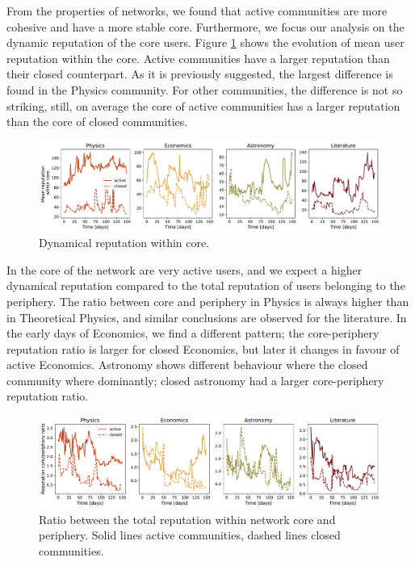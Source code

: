 From the properties of networks, we found that active communities are more cohesive and have a more stable core. Furthermore, we focus our analysis on the dynamic reputation of the core users. Figure \ref{fig:dr_core} shows the evolution of mean user reputation within the core. Active communities have a larger reputation than their closed counterpart. As it is previously suggested, the largest difference is found in the Physics community. For other communities, the difference is not so striking, still, on average the core of active communities has a larger reputation than the core of closed communities. 

\begin{figure}[h]
	\centering
	\includegraphics[width=\linewidth]{figures/stackexchange/core_reputation.pdf}
	\caption{Dynamical reputation within core.}
	\label{fig:dr_core}
\end{figure}

In the core of the network are very active users, and we expect a higher dynamical reputation compared to the total reputation of users belonging to the periphery. The ratio between core and periphery in Physics is always higher than in Theoretical Physics, and similar conclusions are observed for the literature. In the early days of Economics, we find a different pattern; the core-periphery reputation ratio is larger for closed Economics, but later it changes in favour of active Economics. Astronomy shows different behaviour where the closed community where dominantly; closed astronomy had a larger core-periphery reputation ratio. 

\begin{figure}[h!]
	\centering
	\includegraphics[width=\linewidth]{figures/stackexchange/core_per_ratio_reputation.pdf}
	\caption[Ratio between the total reputation within network core and periphery.]{Ratio between the total reputation within network core and periphery. Solid lines active communities, dashed lines closed communities.}
	\label{fig:dr_core_per}
\end{figure}

